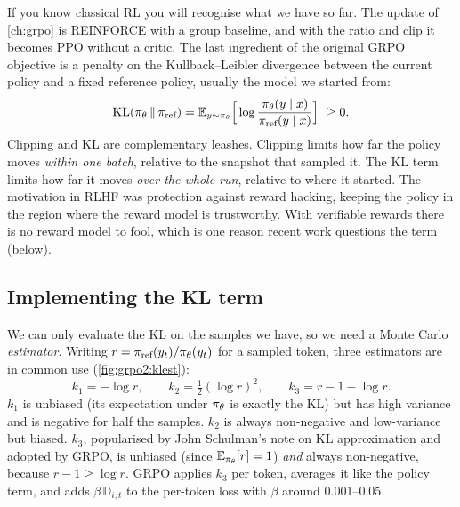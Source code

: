 If you know classical RL you will recognise what we have so far. The update of \cref{ch:grpo}
is REINFORCE with a group baseline, and with the ratio and clip it becomes PPO without a
critic. The last ingredient of the original GRPO objective is a penalty on the
Kullback--Leibler divergence between the current policy and a fixed reference policy, usually
the model we started from:
\begin{equation}
\operatorname{KL}(\pi_\theta\,\|\,\pi_{\text{ref}})=\mathbb{E}_{y\sim\pi_\theta}\Big[\log\frac{\pi_\theta(y\mid x)}{\pi_{\text{ref}}(y\mid x)}\Big]\ \ge 0.
\end{equation}
Clipping and KL are complementary leashes. Clipping limits how far the policy moves
\emph{within one batch}, relative to the snapshot that sampled it. The KL term limits how far it
moves \emph{over the whole run}, relative to where it started. The motivation in RLHF was
protection against reward hacking, keeping the policy in the region where the reward model is
trustworthy. With verifiable rewards there is no reward model to fool, which is one reason
recent work questions the term (below).

\subsection{Implementing the KL term}\label{sec:grpo2:klimpl}

We can only evaluate the KL on the samples we have, so we need a Monte Carlo
\emph{estimator}. Writing $r=\pi_{\text{ref}}(y_t)/\pi_\theta(y_t)$ for a sampled token, three estimators
are in common use (\cref{fig:grpo2:klest}):
\begin{equation}
k_1=-\log r,\qquad k_2=\tfrac12(\log r)^2,\qquad k_3=r-1-\log r .
\end{equation}
$k_1$ is unbiased (its expectation under $\pi_\theta$ is exactly the KL) but has high variance
and is negative for half the samples. $k_2$ is always non-negative and low-variance but
biased. $k_3$, popularised by John Schulman's note on KL approximation and adopted by GRPO,
is unbiased (since $\mathbb{E}_{\pi_\theta}[r]=1$) \emph{and} always non-negative, because
$r-1\ge\log r$. GRPO applies $k_3$ per token, averages it like the policy term, and adds
$\beta\,\mathbb{D}_{i,t}$ to the per-token loss with $\beta$ around 0.001--0.05.

